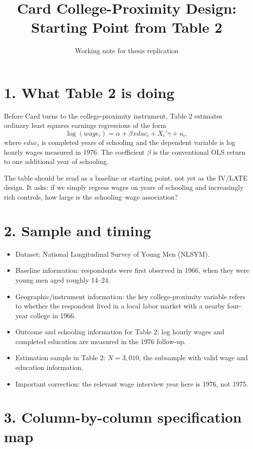 \documentclass[11pt,a4paper]{article}
\title{Card College-Proximity Design: Starting Point from Table 2}
\author{Working note for thesis replication}
\date{}
\begin{document}
\maketitle

\section*{1. What Table 2 is doing}

Before Card turns to the college-proximity instrument, Table 2 estimates ordinary least squares earnings regressions of the form
\[
\log(wage_i)=\alpha + \beta\,educ_i + X_i'\gamma + u_i,
\]
where \(educ_i\) is completed years of schooling and the dependent variable is log hourly wages measured in 1976. The coefficient \(\beta\) is the conventional OLS return to one additional year of schooling.

The table should be read as a baseline or starting point, not yet as the IV/LATE design. It asks: if we simply regress wages on years of schooling and increasingly rich controls, how large is the schooling--wage association?

\section*{2. Sample and timing}

\begin{itemize}
    \item Dataset: National Longitudinal Survey of Young Men (NLSYM).
    \item Baseline information: respondents were first observed in 1966, when they were young men aged roughly 14--24.
    \item Geographic/instrument information: the key college-proximity variable refers to whether the respondent lived in a local labor market with a nearby four-year college in 1966.
    \item Outcome and schooling information for Table 2: log hourly wages and completed education are measured in the 1976 follow-up.
    \item Estimation sample in Table 2: \(N=3{,}010\), the subsample with valid wage and education information.
    \item Important correction: the relevant wage interview year here is 1976, not 1975.
\end{itemize}

\section*{3. Column-by-column specification map}
\end{document}
